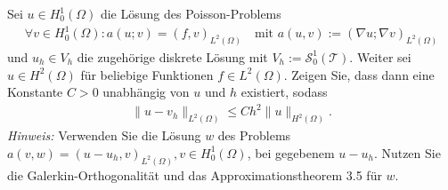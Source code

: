 
\begin{exercise}

Sei $u \in H_0^1(\Omega)$ die Lösung des Poisson-Problems
\begin{align}
  \forall v \in H_0^1(\Omega): a(u;v) = (f,v)_{L^2(\Omega)}
  \quad \text{mit } a(u,v) := (\nabla u; \nabla v)_{L^2(\Omega)}
\end{align}
und $u_h \in V_h$ die zugehörige diskrete Lösung mit
$V_h := \mathcal{S}_0^1(\mathcal{T})$. Weiter sei $u \in H^2(\Omega)$ für
beliebige Funktionen $f \in L^2(\Omega)$. Zeigen Sie, dass dann eine Konstante
$C > 0$ unabhängig von $u$ und $h$ existiert, sodass
\begin{align}
  \|u - v_h\|_{L^2(\Omega)} \leq Ch^2\|u\|_{H^2(\Omega)}.
\end{align}
\textit{Hinweis:} Verwenden Sie die Lösung $w$ des Problems
$a(v,w) = (u - u_h,v)_{L^2(\Omega)}, v \in H_0^1(\Omega)$, bei gegebenem $u - u_h$.
Nutzen Sie die Galerkin-Orthogonalität und das Approximationstheorem 3.5 für $w$.
\end{exercise}


\begin{solution}

\phantom{}

\end{solution}

